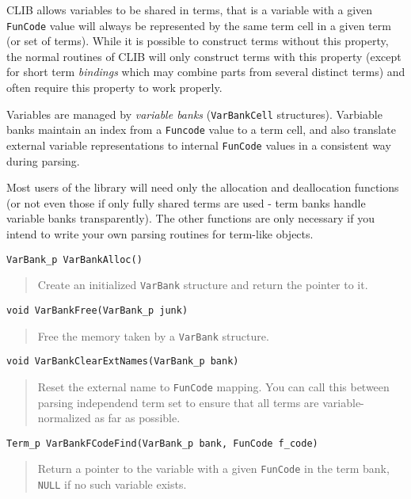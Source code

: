 CLIB allows variables to be shared in terms, that is a variable with a
given \texttt{FunCode} value will always be represented by the same
term cell in a given term (or set of terms). While it is possible to
construct terms without this property, the normal routines of CLIB
will only construct terms with this property (except for short term
\emph{bindings} which may combine parts from several distinct terms)
and often require this property to work properly.

Variables are managed by \emph{variable banks} (\texttt{VarBankCell}
structures). Varbiable banks maintain an index from a \texttt{Funcode}
value to a term cell, and also translate external variable
representations to internal \texttt{FunCode} values in a consistent
way during parsing.

Most users of the library will need only the allocation and
deallocation functions (or not even those if only fully shared terms
are used - term banks handle variable banks transparently). The other
functions are only necessary if you intend to write your own parsing
routines for term-like objects.

\begin{verbatim}
VarBank_p VarBankAlloc()
\end{verbatim}
\begin{quote}
  Create an initialized \texttt{VarBank} structure and return the
  pointer to it.
\end{quote}

\begin{verbatim}
void VarBankFree(VarBank_p junk)
\end{verbatim}
\begin{quote}
  Free the memory taken by a \texttt{VarBank} structure.
\end{quote}

\begin{verbatim}
void VarBankClearExtNames(VarBank_p bank)
\end{verbatim}
\begin{quote}
  Reset the external name to \texttt{FunCode} mapping. You can call
  this between parsing independend term set to ensure that all terms
  are variable-normalized as far as possible.
\end{quote}

\begin{verbatim}
Term_p VarBankFCodeFind(VarBank_p bank, FunCode f_code)
\end{verbatim}
\begin{quote}
  Return a pointer to the variable with a given \texttt{FunCode} in
  the term bank, \texttt{NULL} if no such variable exists.
\end{quote}

